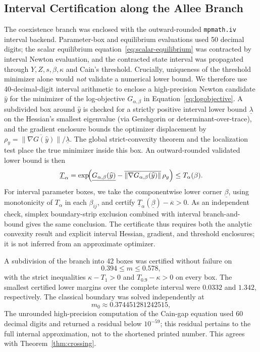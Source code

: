 \subsection{Interval Certification along the Allee Branch}\label{sec:interval-branch}

The coexistence branch was enclosed with the outward-rounded \texttt{mpmath.iv} interval backend. Parameter-box and equilibrium evaluations used 50 decimal digits; the scalar equilibrium equation~\eqref{eq:scalar-equilibrium} was contracted by interval Newton evaluation, and the contracted state interval was propagated through \(Y,Z,s,\beta,\kappa\) and Cain's threshold. Crucially, uniqueness of the threshold minimizer alone would \emph{not} validate a numerical lower bound. We therefore use 40-decimal-digit interval arithmetic to enclose a high-precision Newton candidate \(\widehat y\) for the minimizer of the log-objective \(G_{\alpha,\beta}\) in Equation~\eqref{eq:logobjective}. A subdivided box around \(\widehat y\) is checked for a strictly positive interval lower bound \(\underline\lambda\) on the Hessian's smallest eigenvalue (via Gershgorin or determinant-over-trace), and the gradient enclosure bounds the optimizer displacement by \(\rho_y=\overline{\|\nabla G(\widehat y)\|}/\underline\lambda\). The global strict-convexity theorem and the localization test place the true minimizer inside this box. An outward-rounded validated lower bound is then
\[
 \underline T_\alpha
 =\exp\!\Bigl(\underline{G_{\alpha,\beta}(\widehat y)}
 -\overline{\|\nabla G_{\alpha,\beta}(\widehat y)\|}\,\rho_y\Bigr)
 \le T_\alpha(\beta).
\]
For interval parameter boxes, we take the componentwise lower corner \(\underline\beta\), using monotonicity of \(T_\alpha\) in each \(\beta_{ij}\), and certify \(\underline T_\alpha(\underline\beta)-\overline\kappa>0\). As an independent check, simplex boundary-strip exclusion combined with interval branch-and-bound gives the same conclusion. The certificate thus requires both the analytic convexity result and explicit interval Hessian, gradient, and threshold enclosures; it is not inferred from an approximate optimizer.

A subdivision of the branch into 42 boxes was certified without failure on
\begin{equation}
 0.394\le m\le0.578,
 \label{eq:certified-m-range}
\end{equation}
with the strict inequalities \(\kappa-T_1>0\) and \(T_{0.9}-\kappa>0\) on every box. The smallest certified lower margins over the complete interval were \(0.0332\) and \(1.342\), respectively. The classical boundary was solved independently at
\begin{equation}
 m_0\approx0.374451281242515,
 \label{eq:w2a-m0}
\end{equation}
The unrounded high-precision computation of the Cain-gap equation used 60 decimal digits and returned a residual below \(10^{-59}\); this residual pertains to the full internal approximation, not to the shortened printed number. This agrees with Theorem~\ref{thm:crossing}.

